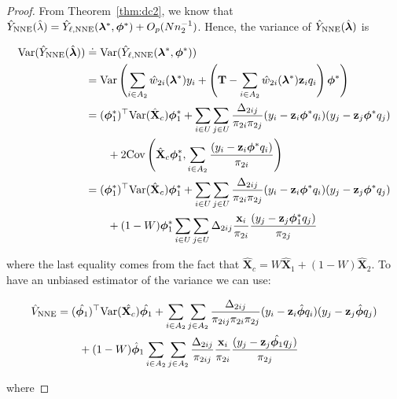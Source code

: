 \documentclass[12pt]{article}
\newcommand{\Cov}{{\text{Cov}}}
\newcommand{\Var}{{\text{Var}}}
\renewcommand{\bf}[1]{\mathbf{#1}}
\begin{document}
\begin{proof}
  From Theorem~\ref{thm:dc2}, we know that $\hat Y_{\rm NNE}(\hat \lambda) = 
  \hat Y_{\ell, \rm NNE}(\bm \lambda^*, \bm \phi^*) + O_p(Nn_2^{-1})$. Hence, the
  variance of $\hat Y_{\rm NNE}(\hat{\bm \lambda})$ is 

  \begin{align*}
    \Var(\hat Y_{\rm NNE}(\hat{\bm \lambda})) 
    &\doteq \Var(\hat Y_{\ell, \rm NNE}(\bm \lambda^*, \bm \phi^*)) \\ 
    &= \Var\left(\sum_{i \in A_2} \hat w_{2i}(\bm \lambda^*) y_i + 
      \left(\bf T - \sum_{i \in A_2} \hat w_{2i}(\bm \lambda^*) \bf z_i
    q_i\right)\bm \phi^*\right)\\
    &= (\bm \phi_1^*)^\top \Var(\hat{\bf X}_c) \bm \phi_1^* + 
    \sum_{i \in U} \sum_{j \in U} \frac{\Delta_{2ij}}{\pi_{2i}\pi_{2j}} 
    (y_i - \bf z_i \bm \phi^* q_i)(y_j - \bf z_j \bm \phi^* q_j)\\
    &\qquad+ 2 \Cov\left(\hat{\bf X}_c \bm \phi_1^*, \sum_{i \in A_2} 
      \frac{(y_i - \bf z_i \bm \phi^* q_i)}{\pi_{2i}}\right) \\
    &= (\bm \phi_1^*)^\top \Var(\hat{\bf X}_c) \bm \phi_1^* + 
    \sum_{i \in U} \sum_{j \in U} \frac{\Delta_{2ij}}{\pi_{2i}\pi_{2j}} 
    (y_i - \bf z_i \bm \phi^* q_i)(y_j - \bf z_j \bm \phi^* q_j)\\
    &\qquad + (1 - W)\bm \phi_1^* \sum_{i \in U} \sum_{j \in U} \Delta_{2ij} 
    \frac{\bf{x}_i}{\pi_{2i}} \frac{(y_j - \bf z_j \bm \phi^*_1 q_j)}{\pi_{2j}}\\
  \end{align*}

where the last equality comes from the fact that $\hat{\bf X}_c = W\hat{\bf
X}_1 + (1 - W) \hat{\bf X}_2$. To have an unbiased estimator of the variance
  we can use:

  \begin{align*}
    \hat V_{\rm NNE} 
    &= (\hat{\bm \phi_1})^\top \Var(\hat{\bf X_c}) \hat{\bm \phi_1} + 
    \sum_{i \in A_2} \sum_{j \in A_2} \frac{\Delta_{2ij}}{\pi_{2ij}\pi_{2i}\pi_{2j}} 
    (y_i - \bf z_i \hat{\bm \phi} q_i)(y_j - \bf z_j \hat{\bm \phi} q_j) \\
    &\qquad + (1 - W)\hat{\bm \phi}_1 \sum_{i \in A_2} \sum_{j \in A_2} 
    \frac{\Delta_{2ij}}{\pi_{2ij}} \frac{\bf{x}_i}{\pi_{2i}} 
    \frac{(y_j - \bf z_j \hat{\bm \phi_1} q_j)}{\pi_{2j}}
  \end{align*}

  where 
  

\end{proof}
\end{document}
